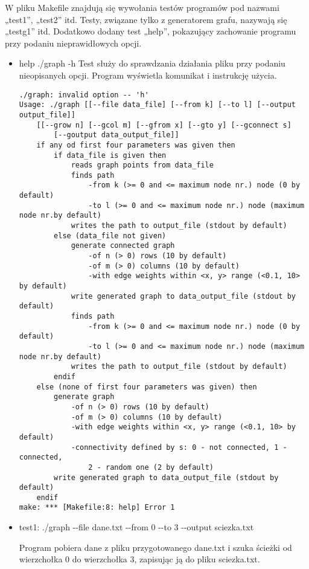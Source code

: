 \documentclass[]{article}
\begin{document}
W pliku Makefile znajdują się wywołania testów programów pod nazwami „test1”, „test2” itd. Testy, związane tylko z generatorem grafu, nazywają się „testg1” itd. Dodatkowo dodany test „help”, pokazujący zachowanie programu przy podaniu nieprawidłowych opcji.
\begin{itemize}
    \item help
    ./graph -h
    Test służy do sprawdzania działania pliku przy podaniu nieopisanych opcji. Program wyświetla komunikat i instrukcję użycia.
\begin{verbatim}
./graph: invalid option -- 'h'
Usage: ./graph [[--file data_file] [--from k] [--to l] [--output output_file]] 
    [[--grow n] [--gcol m] [--gfrom x] [--gto y] [--gconnect s]
        [--goutput data_output_file]]
    if any od first four parameters was given then
        if data_file is given then
            reads graph points from data_file
            finds path
                -from k (>= 0 and <= maximum node nr.) node (0 by default)
                -to l (>= 0 and <= maximum node nr.) node (maximum node nr.by default)
            writes the path to output_file (stdout by default)
        else (data_file not given)
            generate connected graph
                -of n (> 0) rows (10 by default)
                -of m (> 0) columns (10 by default)
                -with edge weights within <x, y> range (<0.1, 10> by default) 
            write generated graph to data_output_file (stdout by default)
            finds path
                -from k (>= 0 and <= maximum node nr.) node (0 by default)
                -to l (>= 0 and <= maximum node nr.) node (maximum node nr.by default)
            writes the path to output_file (stdout by default)
        endif
    else (none of first four parameters was given) then
        generate graph
            -of n (> 0) rows (10 by default)
            -of m (> 0) columns (10 by default)
            -with edge weights within <x, y> range (<0.1, 10> by default) 
            -connectivity defined by s: 0 - not connected, 1 - connected,
                2 - random one (2 by default)
        write generated graph to data_output_file (stdout by default)
    endif
make: *** [Makefile:8: help] Error 1
\end{verbatim}
    \item test1:
    ./graph -{}-file dane.txt -{}-from 0 -{}-to 3 -{}-output sciezka.txt
    
    Program pobiera dane z pliku przygotowanego dane.txt i szuka ścieżki od wierzchołka 0 do wierzchołka 3, zapisując ją do pliku sciezka.txt.
    

\end{itemize}
\end{document}
